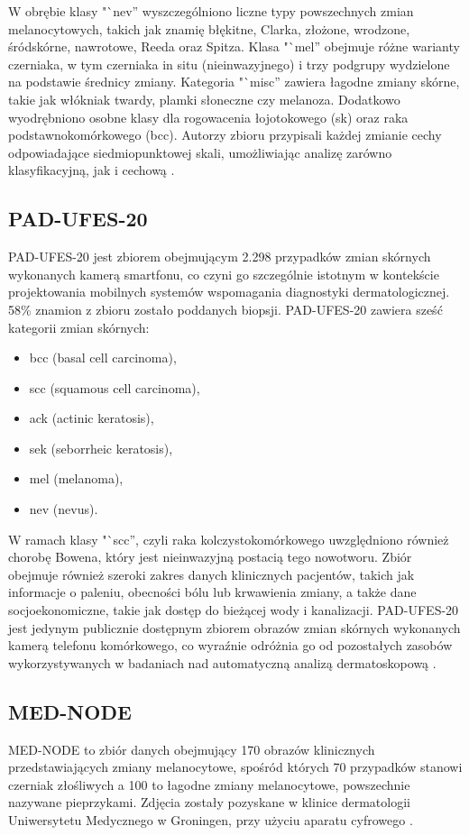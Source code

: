 W obrębie klasy "`nev'' wyszczególniono liczne typy powszechnych zmian melanocytowych, takich jak znamię błękitne, Clarka, złożone, wrodzone, śródskórne, nawrotowe, Reeda oraz Spitza.
Klasa "`mel'' obejmuje różne warianty czerniaka, w tym czerniaka in situ (nieinwazyjnego) i trzy podgrupy wydzielone na podstawie średnicy zmiany.
Kategoria "`misc'' zawiera łagodne zmiany skórne, takie jak włókniak twardy, plamki słoneczne czy melanoza.
Dodatkowo wyodrębniono osobne klasy dla rogowacenia łojotokowego (sk) oraz raka podstawnokomórkowego (bcc).
Autorzy zbioru przypisali każdej zmianie cechy odpowiadające siedmiopunktowej skali, umożliwiając analizę zarówno klasyfikacyjną, jak i cechową \cite{Hamarneh_2019}.

\subsection{PAD-UFES-20}
PAD-UFES-20 jest zbiorem obejmującym 2.298 przypadków zmian skórnych wykonanych kamerą smartfonu, co czyni go szczególnie istotnym w kontekście projektowania mobilnych systemów wspomagania diagnostyki dermatologicznej.
58\% znamion z zbioru zostało poddanych biopsji.
PAD-UFES-20 zawiera sześć kategorii zmian skórnych:
\begin{itemize}
	\item bcc (basal cell carcinoma),
	\item scc (squamous cell carcinoma),
	\item ack (actinic keratosis),
	\item sek (seborrheic keratosis),
	\item mel (melanoma),
	\item nev (nevus).
\end{itemize}
W ramach klasy "`scc'', czyli raka kolczystokomórkowego uwzględniono również chorobę Bowena, który jest nieinwazyjną postacią tego nowotworu.
Zbiór obejmuje również szeroki zakres danych klinicznych pacjentów, takich jak informacje o paleniu, obecności bólu lub krwawienia zmiany, a także dane socjoekonomiczne, takie jak dostęp do bieżącej wody i kanalizacji.
PAD-UFES-20 jest jedynym publicznie dostępnym zbiorem obrazów zmian skórnych wykonanych kamerą telefonu komórkowego, co wyraźnie odróżnia go od pozostałych zasobów wykorzystywanych w badaniach nad automatyczną analizą dermatoskopową \cite{Castro_2020}.

\subsection{MED-NODE}
MED-NODE to zbiór danych obejmujący 170 obrazów klinicznych przedstawiających zmiany melanocytowe, spośród których 70 przypadków stanowi czerniak złośliwych a 100 to łagodne zmiany melanocytowe, powszechnie nazywane pieprzykami.
Zdjęcia zostały pozyskane w klinice dermatologii Uniwersytetu Medycznego w Groningen, przy użyciu aparatu cyfrowego \cite{giotis2015med}.

